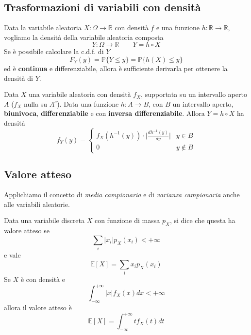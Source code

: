 \subsection{Trasformazioni di variabili con densità}
Data la variabile aleatoria $X: \Omega \to \mathbb{R}$ con densità $f$ e una funzione $h: \mathbb{R} \to \mathbb{R}$, vogliamo la densità della variabile aleatoria composta 
\begin{equation*}
	Y: \Omega \to \mathbb{R} \quad\quad Y=h \circ X
\end{equation*}
Se è possibile calcolare la c.d.f. di $Y$
\begin{equation*}
	F_Y(y)=\mathbb{P}\{Y \leq y\} = \mathbb{P}\{h(X) \leq y\}
\end{equation*}
ed è \textbf{continua} e differenziabile, allora è sufficiente derivarla per ottenere la densità di $Y$.
\begin{proposition}
	Data $X$ una variabile aleatoria con densità $f_X$, supportata su un intervallo aperto $A$ ($f_X$ nulla su $A^c$). Data una funzione $h: A \to B$, con $B$ un intervallo aperto, \textbf{biunivoca}, \textbf{differenziabile} e con \textbf{inversa differenziabile}. Allora $Y = h \circ X$ ha densità
	\begin{equation}
		f_Y(y)=\begin{cases}
			f_X(h^{-1}(y)) \cdot \bigg\lvert \frac{dh^{-1}(y)}{dy}\bigg\rvert & y \in B\\
			0 & y \notin B
		\end{cases}
	\end{equation}
\end{proposition}

\subsection{Valore atteso}
Applichiamo il concetto di \textit{media campionaria} e di \textit{varianza campionaria} anche alle variabili aleatorie.
\begin{definition}
	Data una variabile discreta $X$ con funzione di massa $p_X$, si dice che questa ha valore atteso se
	\begin{equation*}
		\sum_{i}\lvert x_i \rvert p_X(x_i) < +\infty
	\end{equation*}
	e vale
	\begin{equation}
		\mathbb{E}[X]=\sum_{i}x_ip_X(x_i)
	\end{equation}
	Se $X$ è con densità e
	\begin{equation*}
		\int_{-\infty}^{+\infty} \lvert x \rvert f_X(x) dx < + \infty
	\end{equation*}
	allora il valore atteso è
	\begin{equation}
		\mathbb{E}[X]=\int_{-\infty}^{+\infty}t f_X(t)dt
	\end{equation}
\end{definition}

